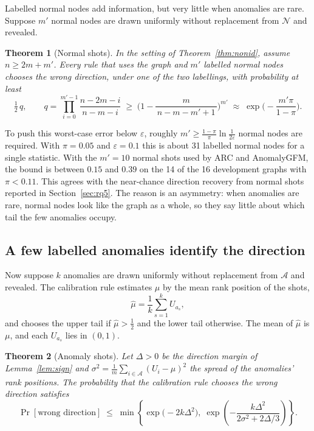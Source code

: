 \documentclass[pdflatex,sn-mathphys-ay]{sn-jnl}
\theoremstyle{plain}
\newtheorem{theorem}{Theorem}
\theoremstyle{remark}
\begin{document}
Labelled normal nodes add information, but very little when anomalies are rare. Suppose $m'$ normal nodes are drawn uniformly without replacement from $\mathcal{N}$ and revealed.

\begin{theorem}[Normal shots]\label{thm:normal}
In the setting of Theorem~\ref{thm:nonid}, assume $n \ge 2m + m'$. Every rule that uses the graph and $m'$ labelled normal nodes chooses the wrong direction, under one of the two labellings, with probability at least
\[
\tfrac12\,q, \qquad
q = \prod_{i=0}^{m'-1}\frac{n-2m-i}{\,n-m-i\,} \;\ge\; \Big(1 - \frac{m}{\,n-m-m'+1\,}\Big)^{m'} \;\approx\; \exp\!\Big(-\frac{m'\pi}{1-\pi}\Big).
\]
\end{theorem}

To push this worst-case error below $\varepsilon$, roughly $m' \ge \frac{1-\pi}{\pi}\ln\frac{1}{2\varepsilon}$ normal nodes are required. With $\pi = 0.05$ and $\varepsilon = 0.1$ this is about 31 labelled normal nodes for a single statistic. With the $m' = 10$ normal shots used by ARC and AnomalyGFM, the bound is between $0.15$ and $0.39$ on the 14 of the 16 development graphs with $\pi < 0.11$. This agrees with the near-chance direction recovery from normal shots reported in Section~\ref{sec:rq5}. The reason is an asymmetry: when anomalies are rare, normal nodes look like the graph as a whole, so they say little about which tail the few anomalies occupy.

\subsection{A few labelled anomalies identify the direction}

Now suppose $k$ anomalies are drawn uniformly without replacement from $\mathcal{A}$ and revealed. The calibration rule estimates $\mu$ by the mean rank position of the shots,
\[
\hat\mu = \frac1k \sum_{s=1}^{k} U_{a_s},
\]
and chooses the upper tail if $\hat\mu > \tfrac12$ and the lower tail otherwise. The mean of $\hat\mu$ is $\mu$, and each $U_{a_s}$ lies in $(0,1)$.

\begin{theorem}[Anomaly shots]\label{thm:anomaly}
Let $\Delta > 0$ be the direction margin of Lemma~\ref{lem:sign} and $\sigma^2 = \frac1m \sum_{i \in \mathcal{A}} (U_i - \mu)^2$ the spread of the anomalies' rank positions. The probability that the calibration rule chooses the wrong direction satisfies
\[
\Pr[\text{wrong direction}] \;\le\; \min\left\{ \exp\!\big(-2k\Delta^2\big),\;
\exp\!\left(-\frac{k\Delta^2}{2\sigma^2 + 2\Delta/3}\right)\right\}.
\]
\end{theorem}
\end{document}
